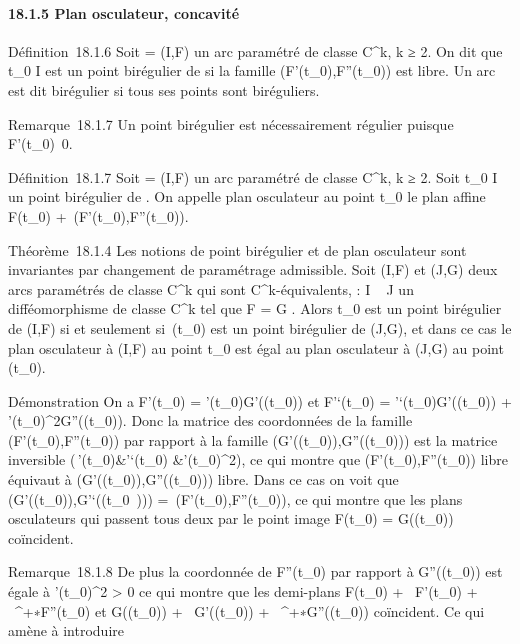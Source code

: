 \documentclass[]{article}
\begin{document}
\paragraph{18.1.5 Plan osculateur, concavité}

Définition~18.1.6 Soit \Gamma = (I,F) un arc paramétré de classe
C^k, k ≥ 2. On dit que t\_0 \in I est un point
birégulier de \Gamma si la famille (F'(t\_0),F''(t\_0)) est
libre. Un arc est dit birégulier si tous ses points sont biréguliers.

Remarque~18.1.7 Un point birégulier est nécessairement régulier puisque
F'(t\_0)\neq~0.

Définition~18.1.7 Soit \Gamma = (I,F) un arc paramétré de classe
C^k, k ≥ 2. Soit t\_0 \in I un point birégulier de \Gamma.
On appelle plan osculateur au point t\_0 le plan affine
F(t\_0) +\
\mathrmVect(F'(t\_0),F''(t\_0)).

Théorème~18.1.4 Les notions de point birégulier et de plan osculateur
sont invariantes par changement de paramétrage admissible. Soit (I,F) et
(J,G) deux arcs paramétrés de classe C^k qui sont
C^k-équivalents, \theta : I \rightarrow~ J un difféomorphisme de classe
C^k tel que F = G \cdot \theta. Alors t\_0 est un point
birégulier de (I,F) si et seulement si~\theta(t\_0) est un point
birégulier de (J,G), et dans ce cas le plan osculateur à (I,F) au point
t\_0 est égal au plan osculateur à (J,G) au point
\theta(t\_0).

Démonstration On a F'(t\_0) =
\theta'(t\_0)G'(\theta(t\_0)) et F'`(t\_0) =
\theta'`(t\_0)G'(\theta(t\_0)) +
\theta'(t\_0)^2G''(\theta(t\_0)). Donc la matrice des
coordonnées de la famille (F'(t\_0),F''(t\_0)) par
rapport à la famille (G'(\theta(t\_0)),G''(\theta(t\_0))) est la
matrice inversible \left
(\matrix\,\theta'(t\_0)&\theta'`(t\_0)
&\theta'(t\_0)^2\right ), ce qui montre
que (F'(t\_0),F''(t\_0)) libre équivaut à
(G'(\theta(t\_0)),G''(\theta(t\_0))) libre. Dans ce cas on voit
que
\mathrmVect(G'(\theta(t\_0)),G'`(\theta(t\_0~)))
=\
\mathrmVect(F'(t\_0),F''(t\_0)), ce
qui montre que les plans osculateurs qui passent tous deux par le point
image F(t\_0) = G(\theta(t\_0)) coïncident.

Remarque~18.1.8 De plus la coordonnée de F''(t\_0) par rapport à
G''(\theta(t\_0)) est égale à \theta'(t\_0)^2
\textgreater{} 0 ce qui montre que les demi-plans F(t\_0) +
~F'(t\_0) + \mathbb{R}~^+∗F''(t\_0) et
G(\theta(t\_0)) + \mathbb{R}~G'(\theta(t\_0)) +
\mathbb{R}~^+∗G''(\theta(t\_0)) coïncident. Ce qui amène à
introduire
\end{document}
